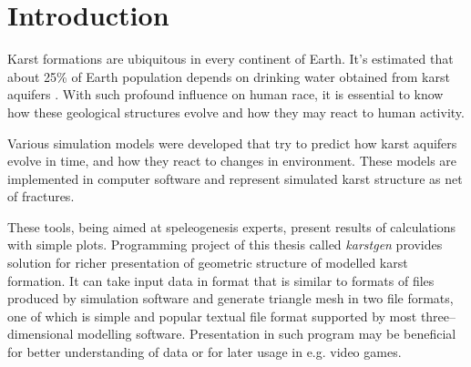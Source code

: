 \chapter{Introduction}

%




Karst formations are ubiquitous in every continent of Earth. It's estimated that
about 25\% of Earth population depends on drinking water obtained from karst
aquifers \parencite{ford2007karst}. With such profound influence on human race,
it is essential to know how these geological structures evolve and how they may
react to human activity.

Various simulation models were developed that try to predict how karst aquifers
evolve in time, and how they react to changes in environment. These models are
implemented in computer software and represent simulated karst structure as
net of fractures.

These tools, being aimed at speleogenesis experts, present results of
calculations with simple plots. Programming project of this thesis called \emph{karstgen} provides
solution for richer presentation of geometric structure of modelled karst
formation. It can take input data in format that is similar to formats of files
produced by simulation software and generate triangle mesh in two file formats,
one of which is simple and popular textual file format supported by most
three--dimensional modelling software. Presentation in such program may be
beneficial for better understanding of data or for later usage in e.g. video
games.

